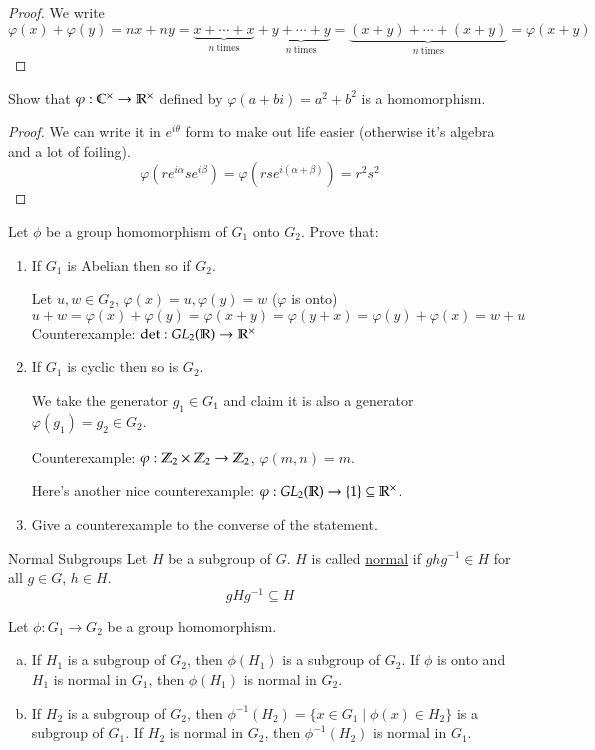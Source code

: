 \begin{proof}
	We write
	\[\varphi(x)+\varphi(y) = nx + ny = \underbrace{x + \cdots + x}_{n\ \text{times}} + \underbrace{y + \cdots + y}_{n\ \text{times}} = \underbrace{(x+y) + \cdots + (x+y)}_{n\ \text{times}}=\varphi(x + y)\]
\end{proof}

\exercise Show that $\varphi:\mathbb{C}^\times \to \mathbb{R}^\times$ defined by $\varphi(a+bi) = a^2+b^2$ is a homomorphism. 

\begin{proof}
We can write it in $e^{i\theta}$ form to make out life easier (otherwise it's algebra and a lot of foiling). 
\[\varphi(re^{i\alpha}se^{i\beta}) = \varphi(rs e^{i(\alpha+\beta)})=r^2s^2\]	
\end{proof}

\exercise Let $\phi$ be a group homomorphism of $G_1$ onto $G_2$. Prove that: 

\begin{enumerate}
	\item If $G_1$ is Abelian then so if $G_2$. 
	
	Let $u,w\in G_2$, $\varphi(x)=u, \varphi(y)=w$ ($\varphi$ is onto)
	\[u+w = \varphi(x) + \varphi(y) = \varphi(x+y) = \varphi(y+x) = \varphi(y) + \varphi(x) =  w + u\]
	Counterexample: $\det : GL_2(\mathbb{R}) \to \mathbb{R}^\times$
	\item If $G_1$ is cyclic then so is $G_2$. 
	
	We take the generator $g_1\in G_1$ and claim it is also a generator $\varphi(g_1) = g_2\in G_2$. 
	
	Counterexample: $\varphi: \mathbb{Z}_2\times \mathbb{Z}_2\to \mathbb{Z}_2$, $\varphi(m,n) = m$. 
	
	Here's another nice counterexample: $\varphi: GL_2(\mathbb{R})\to \{1\}\subseteq \mathbb{R}^\times$. 
	\item Give a counterexample to the converse of the statement. 
\end{enumerate}

\begin{defn}{Normal Subgroups}
Let $H$ be a subgroup of $G$. $H$ is called \ul{normal} if $ghg^{-1}\in H$ for all $g\in G$, $h\in H$. 
\begin{equation}
gHg^{-1}\subseteq H	
\end{equation}
\end{defn}

\begin{proposition}
	Let $\phi:G_1\to G_2$ be a group homomorphism. 
	\begin{enumerate}[(a)]
		\item If $H_1$ is a subgroup of $G_2$, then $\phi(H_1)$ is a subgroup of $G_2$. If $\phi$ is onto and $H_1$ is normal in $G_1$, then $\phi(H_1)$ is normal in $G_2$. 
		\item If $H_2$ is a subgroup of $G_2$, then $\phi^{-1}(H_2)=\{x\in G_1\mid \phi(x)\in H_2\}$ is a subgroup of $G_1$. If $H_2$ is normal in $G_2$, then $\phi^{-1}(H_2)$ is normal in $G_1$. 
	\end{enumerate}
\end{proposition}

